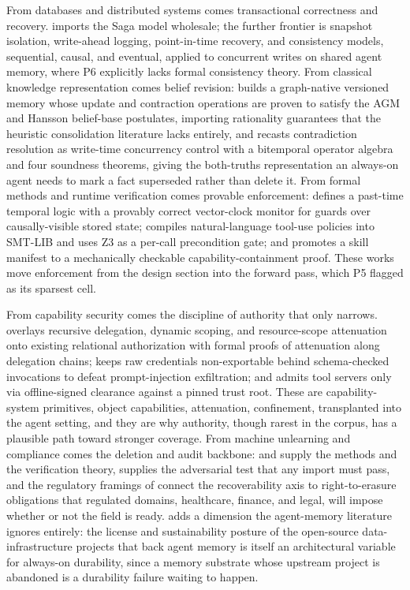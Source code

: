 From databases and distributed systems comes transactional correctness and recovery.
\citet{chang2025sagallm} imports the Saga model wholesale; the further frontier is
snapshot isolation, write-ahead logging, point-in-time recovery, and consistency
models, sequential, causal, and eventual, applied to concurrent writes on shared
agent memory, where P6 explicitly lacks formal consistency theory. From classical
knowledge representation comes belief revision: \citet{park2026kumiho} builds a
graph-native versioned memory whose update and contraction operations are proven to
satisfy the AGM and Hansson belief-base postulates, importing rationality guarantees
that the heuristic consolidation literature lacks entirely, and
\citet{wang2026toki} recasts contradiction resolution as write-time concurrency
control with a bitemporal operator algebra and four soundness theorems, giving the
both-truths representation an always-on agent needs to mark a fact superseded rather
than delete it. From formal methods and runtime verification comes provable
enforcement: \citet{bollig2026causalpast} defines a past-time temporal logic with a
provably correct vector-clock monitor for guards over causally-visible stored state;
\citet{winston2026solveraided} compiles natural-language tool-use policies into
SMT-LIB and uses Z3 as a per-call precondition gate; and
\citet{metere2026skillcontainment} promotes a skill manifest to a mechanically
checkable capability-containment proof. These works move enforcement from the design
section into the forward pass, which P5 flagged as its sparsest cell.

From capability security comes the discipline of authority that only narrows.
\citet{ibrahim2026overlaygovernance} overlays recursive delegation, dynamic scoping,
and resource-scope attenuation onto existing relational authorization with formal
proofs of attenuation along delegation chains; \citet{jin2026capseal} keeps raw
credentials non-exportable behind schema-checked invocations to defeat prompt-injection
exfiltration; and \citet{metere2026attestedtoolserver} admits tool servers only via
offline-signed clearance against a pinned trust root. These are capability-system
primitives, object capabilities, attenuation, confinement, transplanted into the
agent setting, and they are why authority, though rarest in the corpus, has
a plausible path toward stronger coverage. From machine unlearning and compliance comes the deletion
and audit backbone: \citet{nguyen2024machineunlearningsurvey} and
\citet{xue2025unlearningverificationsurvey} supply the methods and the verification
theory, \citet{shah2026unlearningmirage} supplies the adversarial test that any
import must pass, and the regulatory framings of \citet{staufer2025whatshouldllmsforget}
connect the recoverability axis to right-to-erasure obligations that regulated
domains, healthcare, finance, and legal, will impose whether or not the field is
ready. \citet{dmitrenko2026memorycomponents} adds a dimension the agent-memory
literature ignores entirely: the license and sustainability posture of the
open-source data-infrastructure projects that back agent memory is itself an
architectural variable for always-on durability, since a memory substrate whose
upstream project is abandoned is a durability failure waiting to happen.

